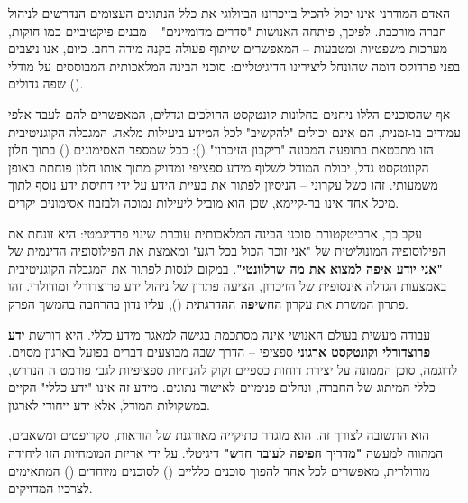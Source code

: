 \label{sec:chapter14}


האדם המודרני אינו יכול להכיל בזיכרונו הביולוגי את כלל הנתונים העצומים הנדרשים לניהול חברה מורכבת. לפיכך, פיתחה האנושות "סדרים מדומיינים" – מבנים פיקטיביים כמו חוקות, מערכות משפטיות ומטבעות – המאפשרים שיתוף פעולה בקנה מידה רחב. כיום, אנו ניצבים בפני פרדוקס דומה שהונחל ליצירינו הדיגיטליים: סוכני הבינה המלאכותית המבוססים על מודלי שפה גדולים ().

אף שהסוכנים הללו ניחנים בחלונות קונטקסט ההולכים וגדלים, המאפשרים להם לעבד אלפי עמודים בו-זמנית, הם אינם יכולים "להקשיב" לכל המידע ביעילות מלאה. המגבלה הקוגניטיבית הזו מתבטאת בתופעה המכונה "ריקבון הזיכרון" ()\cite{liu2023lost}: ככל שמספר האסימונים () בתוך חלון הקונטקסט גדל, יכולת המודל לשלוף מידע ספציפי ומדויק מתוך אותו חלון פוחתת באופן משמעותי. זהו כשל עקרוני – הניסיון לפתור את בעיית הידע על ידי דחיסת ידע נוסף לתוך מיכל אחד אינו בר-קיימא, שכן הוא מוביל ליעילות נמוכה ולבזבוז אסימונים יקרים\cite{anthropic2025context}.

עקב כך, ארכיטקטורת סוכני הבינה המלאכותית עוברת שינוי פרדיגמטי: היא זונחת את הפילוסופיה המונוליטית של "אני זוכר הכול בכל רגע" ומאמצת את הפילוסופיה הדינמית של \textbf{"אני יודע איפה למצוא את מה שרלוונטי"}. במקום לנסות לפתור את המגבלה הקוגניטיבית באמצעות הגדלה אינסופית של הזיכרון,  הציעה פתרון של ניהול ידע פרוצדורלי ומודולרי\cite{anthropic2025progressive}. זהו פתרון המשרת את עקרון \textbf{החשיפה ההדרגתית} (), עליו נדון בהרחבה בהמשך הפרק.


עבודה מעשית בעולם האנושי אינה מסתכמת בגישה למאגר מידע כללי. היא דורשת \textbf{ידע פרוצדורלי וקונטקסט ארגוני} ספציפי – הדרך שבה מבוצעים דברים בפועל בארגון מסוים. לדוגמה, סוכן הממונה על יצירת דוחות כספיים זקוק להנחיות ספציפיות לגבי פורמט ה הנדרש, כללי המיתוג של החברה, ונהלים פנימיים לאישור נתונים. מידע זה אינו "ידע כללי" הקיים במשקולות המודל, אלא ידע ייחודי לארגון.

 הוא התשובה לצורך זה. הוא מוגדר כתיקייה מאורגנת של הוראות, סקריפטים ומשאבים, המהווה למעשה \textbf{"מדריך חפיפה לעובד חדש"} דיגיטלי\cite{anthropic2025skills}. על ידי אריזת המומחיות הזו ליחידה מודולרית,  מאפשרים לכל אחד להפוך סוכנים כלליים () לסוכנים מיוחדים () המתאימים לצרכיו המדויקים.

